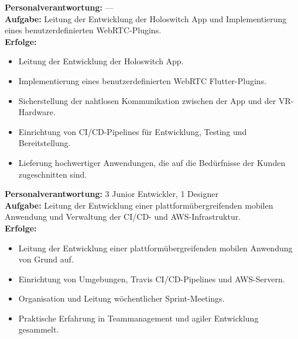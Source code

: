 \documentclass[10pt,a4paper,normalphoto]{altacv}
\begin{document}
\begin{fullwidth}
\vspace{1em}


\newpage

\textbf{Personalverantwortung:} —\\
\textbf{Aufgabe:} Leitung der Entwicklung der Holoswitch App und Implementierung eines benutzerdefinierten WebRTC-Plugins.\\
\textbf{Erfolge:}
\begin{itemize}
    \item Leitung der Entwicklung der Holoswitch App.
    \item Implementierung eines benutzerdefinierten WebRTC Flutter-Plugins.
    \item Sicherstellung der nahtlosen Kommunikation zwischen der App und der VR-Hardware.
    \item Einrichtung von CI/CD-Pipelines für Entwicklung, Testing und Bereitstellung.
    \item Lieferung hochwertiger Anwendungen, die auf die Bedürfnisse der Kunden zugeschnitten sind.
\end{itemize}

\vspace{1em}


\vspace{2em}

\textbf{Personalverantwortung:} 3 Junior Entwickler, 1 Designer\\
\textbf{Aufgabe:} Leitung der Entwicklung einer plattformübergreifenden mobilen Anwendung und Verwaltung der CI/CD- und AWS-Infrastruktur.\\
\textbf{Erfolge:}
\begin{itemize}
    \item Leitung der Entwicklung einer plattformübergreifenden mobilen Anwendung von Grund auf.
    \item Einrichtung von Umgebungen, Travis CI/CD-Pipelines und AWS-Servern.
    \item Organisation und Leitung wöchentlicher Sprint-Meetings.
    \item Praktische Erfahrung in Teammanagement und agiler Entwicklung gesammelt.
\end{itemize}


\end{fullwidth}
\end{document}
